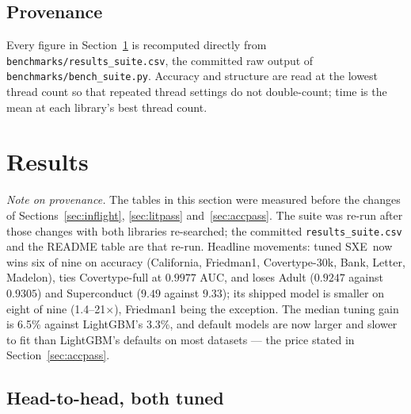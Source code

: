 \documentclass[11pt,a4paper]{article}
\newcommand{\code}[1]{\texttt{\small #1}}
\newcommand{\SXE}{\textsc{SXE}}
\theoremstyle{definition}
\begin{document}
\subsection{Provenance}

Every figure in Section~\ref{sec:results} is recomputed directly from
\code{benchmarks/results\_suite.csv}, the committed raw output of
\code{benchmarks/bench\_suite.py}. Accuracy and structure are read at the lowest
thread count so that repeated thread settings do not double-count;
time is the mean at each library's best thread count.

\section{Results}\label{sec:results}

\emph{Note on provenance.} The tables in this section were measured before the
changes of Sections~\ref{sec:inflight}, \ref{sec:litpass} and~\ref{sec:accpass}.
The suite was re-run after those changes with both libraries re-searched; the
committed \code{results\_suite.csv} and the README table are that re-run.
Headline movements: tuned \SXE\ now wins six of nine on accuracy (California,
Friedman1, Covertype-30k, Bank, Letter, Madelon), ties Covertype-full at
$0.9977$ AUC, and loses Adult ($0.9247$ against $0.9305$) and Superconduct
($9.49$ against $9.33$); its shipped model is smaller on eight of nine
(1.4--21$\times$), Friedman1 being the exception. The median tuning gain is
6.5\% against LightGBM's 3.3\%, and default models are now larger and slower to
fit than LightGBM's defaults on most datasets --- the price stated in
Section~\ref{sec:accpass}.

\subsection{Head-to-head, both tuned}
\end{document}
